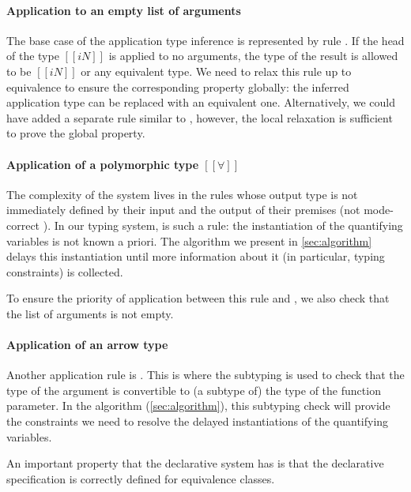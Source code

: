 \paragraph{Application to an empty list of arguments}
  The base case of the application type inference is 
  represented by rule .
  If the head of the type $[[iN]]$ is applied to no arguments, 
  the type of the result is allowed to be $[[iN]]$ or any 
  equivalent type. We need to relax this rule up to equivalence
  to ensure the corresponding property globally:
  the inferred application type can be replaced with an equivalent one.
  Alternatively, we could have added a separate rule similar to 
  , however, 
  the local relaxation is sufficient to prove the global property.

\paragraph{Application of a polymorphic type $[[∀]]$}
  The complexity of the system lives in the rules whose output type is not
  immediately defined by their input and the output of their premises (\aka not
  mode-correct \cite{dunfield2020:bidirectional}). In our typing system,
   is such a rule: the instantiation of the
  quantifying variables is not known a priori. The algorithm we present in
  \cref{sec:algorithm} delays this instantiation until more information about it
  (in particular, typing constraints) is collected.

  To ensure the priority of application between this rule and 
  , we also check that 
  the list of arguments is not empty.

\paragraph{Application of an arrow type}
  Another application rule is .
  This is where the subtyping is used to check that the type of the argument
  is convertible to (a subtype of) the type of the function parameter.
  In the algorithm (\cref{sec:algorithm}), this subtyping check will provide the constraints
  we need to resolve the delayed instantiations of the quantifying variables.

  \vspace{\baselineskip}
  An important property that the declarative system has is
  that the declarative specification is correctly defined for
  equivalence classes.

